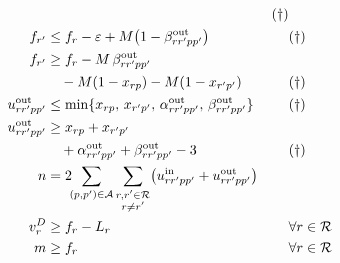 \begin{align}
    && (\dagger) \label{eq:alphaOutUB}\\
  f_{r'} &\le f_r - \varepsilon
              + M\bigl(1 - \beta^{\mathrm{out}}_{rr'pp'}\bigr)
    && (\dagger) \label{eq:betaOutUB}\\
  f_{r'} &\ge f_r - M\,\beta^{\mathrm{out}}_{rr'pp'} \notag\\
         &\quad - M(1 - x_{rp}) - M(1 - x_{r'p'})
    && (\dagger) \label{eq:betaOutLB}\\
  u^{\mathrm{out}}_{rr'pp'} &\le \min\{x_{rp},\, x_{r'p'},\,
                                    \alpha^{\mathrm{out}}_{rr'pp'},\,
                                    \beta^{\mathrm{out}}_{rr'pp'}\}
    && (\dagger) \label{eq:uOutUB}\\
  u^{\mathrm{out}}_{rr'pp'} &\ge x_{rp} + x_{r'p'} \notag\\
                            &\quad + \alpha^{\mathrm{out}}_{rr'pp'}
                            + \beta^{\mathrm{out}}_{rr'pp'} - 3
    && (\dagger) \label{eq:uOut}\\
  n &= 2 \!\!\sum_{(p,p') \in \mathcal{A}}
         \sum_{\substack{r, r' \in \mathcal{R}\\ r \ne r'}}
         \bigl(u^{\mathrm{in}}_{rr'pp'} + u^{\mathrm{out}}_{rr'pp'}\bigr)
    && \label{eq:movements}\\
  v^D_r &\ge f_r - L_r
    && \forall r \in \mathcal{R} \label{eq:delay}\\
  m &\ge f_r
    && \forall r \in \mathcal{R} \label{eq:makespan}
\end{align}

